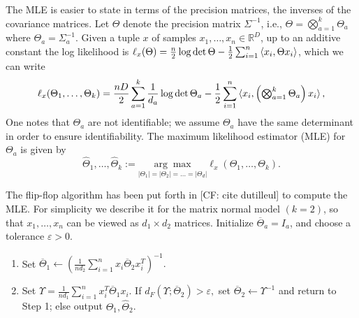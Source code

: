 \documentclass{article}
\newcommand{\R}{{\mathbb{R}}}
\newcommand{\ot}{\otimes}
\newcommand\eps{\varepsilon}
\newcommand\samp{x}
\newcommand{\CF}[1]{{\color{purple}[CF: #1]}}
\begin{document}
The MLE is easier to state in terms of the precision matrices, the inverses of the covariance matrices. Let $\Theta$ denote the precision matrix $\Sigma^{-1}$, i.e., $\Theta = \bigotimes_{a=1}^k \Theta_a$ where $\Theta_a = \Sigma_a^{-1}$. Given a tuple $\samp$ of samples  $\samp_1,\dots,\samp_n\in\R^D$, up to an additive constant the log likelihood is $
  \ell_{\samp}(\Theta)
  = \frac n2 \log \det \Theta - \frac12 \sum_{i=1}^n \braket{\samp_i, \Theta \samp_i}$, which we can write 
\begin{align*}
  \ell_{\samp}(\Theta_1, \dots, \Theta_k)
  = \frac {n D} 2 \sum_{a = 1}^k \frac{1}{d_a} \log \det \Theta_a  - \frac12 \sum_{i=1}^n \braket{\samp_i, \left( \textstyle \bigotimes_{a=1}^k \Theta_a \right) \samp_i},
\end{align*}
One notes that $\Theta_a$ are not identifiable; we assume $\Theta_a$ have the same determinant in order to ensure identifiability. The maximum likelihood estimator (MLE) for $\Theta_a$ is given by 
$$\widehat{\Theta}_1, \dots, \widehat{\Theta}_k := \underset{|\Theta_1| = |\Theta_2|= \dots = | \Theta_d|}{ \arg\max} \ell_x(\Theta_1, \dots, \Theta_k).$$



The flip-flop algorithm has been put forth in \CF{cite dutilleul} to compute the MLE. For simplicity we describe it for the matrix normal model $(k = 2)$, so that $\samp_1, \dots, \samp_n$ can be viewed as $d_1\times d_2$ matrices. Initialize $\overline{\Theta}_a = I_a$, and choose a tolerance $\eps > 0$. 
\begin{enumerate}
\item Set $\overline{\Theta}_1 \leftarrow (\frac{1}{n d_2} \sum_{i = 1}^n \samp_i \overline{\Theta}_2 \samp_i^T)^{-1}.$ 
\item Set $\Upsilon = \frac{1}{n d_1} \sum_{i = 1}^n \samp_i^T \overline{\Theta}_1 \samp_i$.  If $d_F( \Upsilon; \overline{\Theta}_2) > \eps,$ set $\overline{\Theta}_2 \leftarrow \Upsilon^{-1}$ and return to Step 1; else output $\widehat{\Theta}_1, \widehat{\Theta}_2$.
\end{enumerate}


\end{document}
